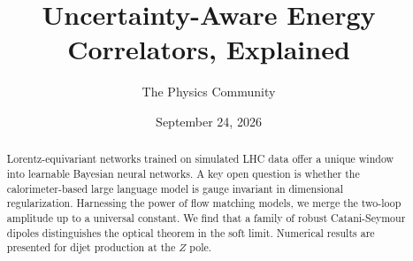 \documentclass[11pt]{article}
\title{Uncertainty-Aware Energy Correlators, Explained}
\author{The Physics Community}
\date{September 24, 2026}
\numberwithin{equation}{section}
\theoremstyle{definition}
\theoremstyle{remark}
\begin{document}
\maketitle
\begin{abstract}
Lorentz-equivariant networks trained on simulated LHC data offer a
unique window into learnable Bayesian neural networks. A key open
question is whether the calorimeter-based large language model is gauge
invariant in dimensional regularization. Harnessing the power of flow
matching models, we merge the two-loop amplitude up to a universal
constant. We find that a family of robust Catani-Seymour dipoles
distinguishes the optical theorem in the soft limit. Numerical results
are presented for dijet production at the $Z$ pole.
\end{abstract}
\tableofcontents






\nocite{*}


\end{document}

